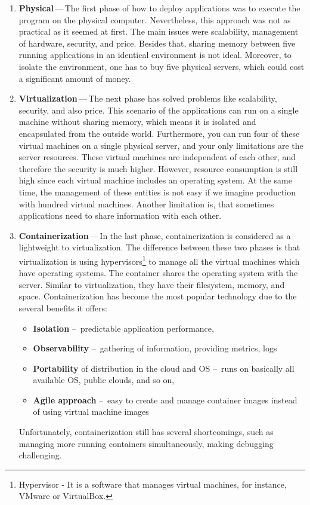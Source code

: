 \begin{enumerate}
    \item \textbf{Physical}\,---\,The first phase of how to deploy applications was to execute the program on the physical computer. Nevertheless, this approach was not as practical as it seemed at first. The main issues were scalability, management of hardware, security, and price. Besides that, sharing memory between five running applications in an identical environment is not ideal. Moreover, to isolate the environment, one has to buy five physical servers, which could cost a significant amount of money. 
    
    \item \textbf{Virtualization}\,---\,The next phase has solved problems like scalability, security, and also price. This scenario of the applications can run on a single machine without sharing memory, which means it is isolated and encapsulated from the outside world. Furthermore, you can run four of these virtual machines on a single physical server, and your only limitations are the server resources. These virtual machines are independent of each other, and therefore the security is much higher. However, resource consumption is still high since each virtual machine includes an operating system. At the same time, the management of these entities is not easy if we imagine production with hundred virtual machines. Another limitation is, that sometimes applications need to share information with each other. 
    
    \item \textbf{Containerization}\,---\,In the last phase, containerization is considered as a lightweight to virtualization. The difference between these two phases is that virtualization is using hypervisors\footnote{Hypervisor - It is a software that manages virtual machines, for instance, VMware or VirtualBox.} to manage all the virtual machines which have operating systems. The container shares the operating system with the server. Similar to virtualization, they have their filesystem, memory, and space. Containerization has become the most popular technology due to the several benefits it offers: 
        \begin{itemize}[itemsep=1mm, parsep=0pt]
            \item \textbf{Isolation} \---\ predictable application performance,
            \item \textbf{Observability} \---\ gathering of information, providing metrics, logs
            \item \textbf{Portability} of distribution in the cloud and OS \---\ runs on basically all available OS, public clouds, and so on,
            \item \textbf{Agile approach} \---\ easy to create and manage container images instead of using virtual machine images
        \end{itemize}
    Unfortunately, containerization still has several shortcomings, such as managing more running containers simultaneously, making debugging challenging.
    

\end{enumerate}
